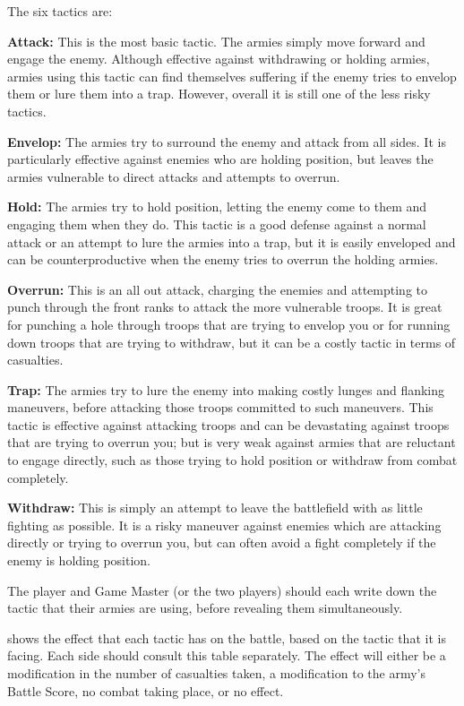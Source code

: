 \begin{multicols*}{2}
The six tactics are:

\textbf{Attack:} This is the most basic tactic. The armies simply move forward and engage the enemy. Although effective against withdrawing or holding armies, armies using this tactic can find themselves suffering if the enemy tries to envelop them or lure them into a trap. However, overall it is still one of the less risky tactics.

\textbf{Envelop:} The armies try to surround the enemy and attack from all sides. It is particularly effective against enemies who are holding position, but leaves the armies vulnerable to direct attacks and attempts to overrun.

\textbf{Hold:} The armies try to hold position, letting the enemy come to them and engaging them when they do. This tactic is a good defense against a normal attack or an attempt to lure the armies into a trap, but it is easily enveloped and can be counterproductive when the enemy tries to overrun the holding armies.

\textbf{Overrun:} This is an all out attack, charging the enemies and attempting to punch through the front ranks to attack the more vulnerable troops. It is great for punching a hole through troops that are trying to envelop you or for running down troops that are trying to withdraw, but it can be a costly tactic in terms of casualties.

\textbf{Trap:} The armies try to lure the enemy into making costly lunges and flanking maneuvers, before attacking those troops committed to such maneuvers. This tactic is effective against attacking troops and can be devastating against troops that are trying to overrun you; but is very weak against armies that are reluctant to engage directly, such as those trying to hold position or withdraw from combat completely.

\textbf{Withdraw:} This is simply an attempt to leave the battlefield with as little fighting as possible. It is a risky maneuver against enemies which are attacking directly or trying to overrun you, but can often avoid a fight completely if the enemy is holding position.

The player and Game Master (or the two players) should each write down the tactic that their armies are using, before revealing them simultaneously.

 shows the effect that each tactic has on the battle, based on the tactic that it is facing. Each side should consult this table separately. The effect will either be a modification in the number of casualties taken, a modification to the army’s Battle Score, no combat taking place, or no effect.


\end{multicols*}
